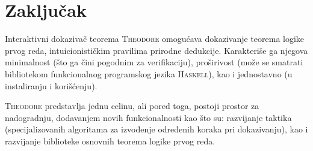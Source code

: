 \documentclass[a4paper,10pt]{article}
\theoremstyle{definition}
\begin{document}
\section{Zaklju\v cak}
\label{sec:zakljucak}

Interaktivni dokazivač teorema \textsc{Theodore} omogućava dokazivanje teorema logike prvog reda, intuicionističkim pravilima prirodne dedukcije. Karakteriše ga njegova minimalnost (što ga čini pogodnim za verifikaciju), proširivost (može se smatrati bibliotekom funkcionalnog programskog jezika \textsc{Haskell}), kao i jednostavno (u instaliranju i korišćenju). 

\textsc{Theodore} predstavlja jednu celinu, ali pored toga, postoji prostor za nadogradnju, dodavanjem novih funkcionalnosti kao što su: razvijanje taktika (specijalizovanih algoritama za izvođenje određenih koraka pri dokazivanju), kao i razvijanje biblioteke osnovnih teorema logike prvog reda.

\nocite{*}
\printbibliography
\end{document}
